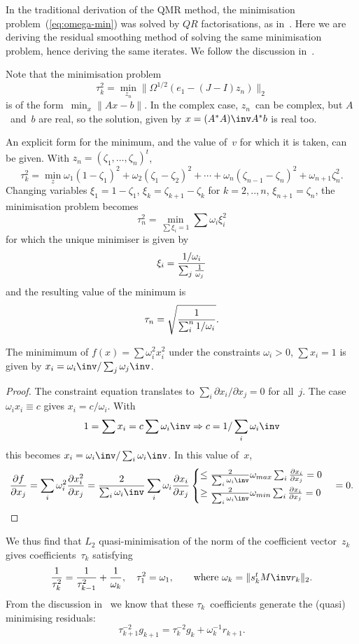 \documentclass[11pt]{artikel3}
\begin{document}
\begin{Outline}
In the traditional derivation of the QMR method, the minimisation
problem~(\ref{eq:omega-min}) was solved by $QR$ factorisations, as
in~\cite{Fr:cgcomplexsymmetric,FrNa:qmr}.
Here we are deriving the residual smoothing method of solving 
the same minimisation problem, hence deriving the same iterates.
We follow the discussion in~\cite{ZhWa:residual-smoothing}.

Note that the minimisation problem
 \[ \tau_k^2=\min_{z_n}\|\Omega^{1/2}(e_1-(J-I)z_n)\|_2 \]
is of the form~$\min_x\|Ax-b\|$.
In the complex case, $z_n$~can be complex, but $A$~and~$b$ are real,
so the solution, given by $x=(A^*A)\inv A^*b$ is real too.

An explicit form for the minimum, and the value of~$v$ for
which it is taken, can be given.
With $z_n=(\zeta_1,\ldots,\zeta_n)^t$,
 \[\tau_k^2=\min_z\omega_1(1-\zeta_1)^2+\omega_2(\zeta_1-\zeta_2)^2
    +\cdots+\omega_n(\zeta_{n-1}-\zeta_n)^2+\omega_{n+1}\zeta_n^2.
 \]
Changing variables $\xi_1=1-\zeta_1$, $\xi_k=\zeta_{k+1}-\zeta_k$ for
$k=2,..,n$, $\xi_{n+1}=\zeta_n$, the minimisation problem becomes
 \[ \tau_n^2=\min_{\sum\xi_i=1}\sum\omega_i\xi_i^2 \]
for which the unique minimiser is given by
 \[ \xi_i = {1/\omega_i\over \sum_j {1\over\omega_j}} \]
and the resulting value of the minimum is
 \[ \tau_n=\sqrt{1\over\sum_i^n1/\omega_i}. \]

\begin{lemma}
The minimimum of $f(x)=\sum\omega_i^2x_i^2$ under the constraints
$\omega_i>0$, $\sum x_i=1$ is given by
$x_i=\omega_i\inv/\sum_j\omega_j\inv$.
\end{lemma}
\begin{proof}
The constraint equation translates to $\sum_i\partial x_i/\partial x_j=0$ for
all~$j$. The case $\omega_ix_i\equiv c$ gives $x_i=c/\omega_i$. With
\[ 1=\sum x_i=c\sum\omega_i\inv \Rightarrow c=1/\sum_i\omega_i\inv \]
this becomes $x_i=\omega_i\inv/\sum_i\omega_i\inv$.
In this value of~$x$, 
\[ {\partial f\over \partial x_j}=\sum_i\omega_i^2{\partial x_i^2\over \partial x_j}
  = {2\over \sum_i\omega_i\inv}\sum_i\omega_i{\partial x_i\over \partial x_j}
  \begin{cases}\leq {2\over \sum_i\omega_i\inv}
               \omega\sb{max}\sum_i{\partial x_i\over \partial x_j}=0\cr
         \geq {2\over \sum_i\omega_i\inv}
               \omega\sb{min}\sum_i{\partial x_i\over \partial x_j}=0\cr\end{cases}
  =0.\]
\end{proof}


We thus find that $L_2$ quasi-minimisation of the 
norm of the coefficient
vector~$z_k$ gives coefficients~$\tau_k$ satisfying
 \begin{equation}
     {1\over \tau_k^2}={1\over \tau_{k-1}^2}+{1\over\omega_k},\quad
    \tau_1^2=\omega_1,\qquad
    \hbox{where $\omega_k=\|s_k^tM\inv r_k\|_2$.}
        \label{eq:smooth-h}\end{equation}
From the discussion in~\cite{ZhWa:residual-smoothing} we know
that these $\tau_k$~coefficients generate the (quasi) minimising
residuals:
 \[ \tau_{k+1}^{-2}g_{k+1}=\tau_{k}^{-2}g_k+\omega_k^{-1}r_{k+1}.\]


\end{Outline}
\end{document}
